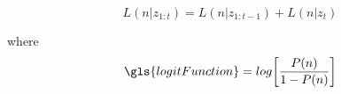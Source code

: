 \begin{equation}\label{eq:octomap_relax}
  L(n|z_{1:t}) =L(n|z_{1:t-1}) + L(n|z_t)
\end{equation}

where
\begin{equation}
  \gls{logitFunction} = log \biggl[ \frac{P(n)}{1-P(n)} \biggr]
\end{equation}
